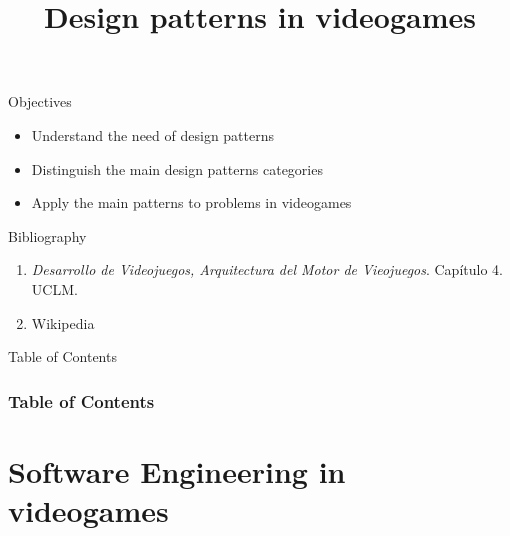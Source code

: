 \documentclass[10pt,compress]{beamer} %
\title[Design patterns in videogames]{Design patterns in videogames}
\author{}
\institute{\asignatura}
\date{}
\begin{document}
{\titlepageBlue
    \begin{frame}
        \titlepage
    \end{frame}
}

\begin{frame}[plain]{}
   \begin{block}{Objectives}
   \begin{itemize}
        \item Understand the need of design patterns
		\item Distinguish the main design patterns categories
		\item Apply the main patterns to problems in videogames
	\end{itemize}
	\end{block}

   \begin{block}{Bibliography}
      \begin{enumerate}
          \item  \textit{Desarrollo de Videojuegos, Arquitectura del Motor de Vieojuegos}. Capítulo 4. UCLM.
		  \item Wikipedia
      \end{enumerate} 
   \end{block}
\end{frame}

{
\eliminarNavegacion
\begin{frame}[shrink]{Table of Contents}
 \frametitle{Table of Contents}
 \tableofcontents
\end{frame}
}

\section{Software Engineering in videogames}
\end{document}
